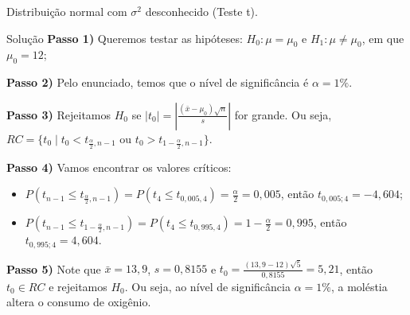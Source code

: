 \documentclass[8pt]{beamer}
\begin{document}
\begin{frame}{Distribuição normal com $\sigma^2$ desconhecido (Teste t).}

\begin{block}{Solução}
	\textbf{Passo 1)} Queremos testar as hipóteses: $H_0: \mu = \mu_0$ e $H_1: \mu \neq \mu_0$, em que $\mu_0=12$;
	
	\textbf{Passo 2)} Pelo enunciado, temos que o nível de significância é $\alpha=1\%$.
	
	\textbf{Passo 3)} Rejeitamos $H_0$ se $\lvert t_0 \rvert = \left\lvert \frac{(\bar{x} - \mu_0)\sqrt{n}}{s} \right\rvert$ for grande. Ou seja, $RC = \{ t_0 \mid t_0 < t_{\frac{\alpha}{2}, n-1} \mbox{ ou } t_0 > t_{1-\frac{\alpha}{2}, n-1} \}.$
	
	\textbf{Passo 4)} Vamos encontrar os valores críticos:
	\begin{itemize}
		\item $P\left( t_{n-1} \leq t_{\frac{\alpha}{2}, n-1} \right) = P\left( t_{4} \leq t_{0,005,4} \right) = \frac{\alpha}{2} = 0,005$, então $t_{0,005; 4} = -4,604$;
		\item $P\left( t_{n-1} \leq t_{1-\frac{\alpha}{2}, n-1} \right) = P\left( t_{4} \leq t_{0,995, 4} \right) = 1-\frac{\alpha}{2} = 0,995$, então $t_{0,995; 4} = 4,604$.
	\end{itemize}

	\textbf{Passo 5)} Note que $\bar{x} = 13,9$, $s = 0,8155$ e $t_0 = \frac{(13,9 - 12)\sqrt{5}}{0,8155} = 5,21$, então $t_0 \in RC$ e rejeitamos $H_0$. Ou seja, ao nível de significância $\alpha=1\%$, a moléstia altera o consumo de oxigênio.
\end{block}

\end{frame}
\end{document}
